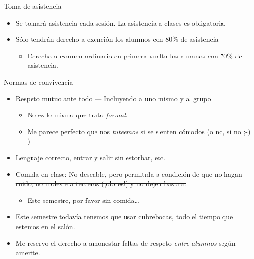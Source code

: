 \documentclass[presentation]{beamer}
\begin{document}
\begin{frame}[label={sec:orge1fcc9e}]{Toma de asistencia}
\begin{itemize}
\item \alert{Se tomará asistencia} cada sesión. La asistencia a clases \alert{es
obligatoria}.
\end{itemize}

\begin{itemize}
\item Sólo tendrán derecho a exención los alumnos con \alert{80\%} de asistencia
\begin{itemize}
\item Derecho a examen ordinario en primera vuelta los alumnos con \alert{70\%}
de asistencia.
\end{itemize}
\end{itemize}
\end{frame}

\begin{frame}[label={sec:org0319b4f}]{Normas de convivencia}
\begin{itemize}
\item Respeto mutuo ante todo — Incluyendo a uno mismo y al grupo
\begin{itemize}
\item No es lo mismo que trato \emph{formal}.
\item Me parece perfecto que nos \emph{tuteemos} si se sienten cómodos (o no,
si no ;-) )
\end{itemize}
\item Lenguaje correcto, entrar y salir sin estorbar, etc.
\item \sout{Comida en clase: No deseable, pero permitida a condición de que no
hagan ruido, no moleste a terceros (¡olores!) y no dejen basura.}
\begin{itemize}
\item Este semestre, por favor sin comida\ldots{}
\end{itemize}
\item Este semestre \alert{todavía tenemos que usar cubrebocas}, todo el tiempo
que estemos en el salón.
\item Me reservo el derecho a amonestar faltas de respeto \emph{entre
alumnos} según amerite.
\end{itemize}
\end{frame}
\end{document}
